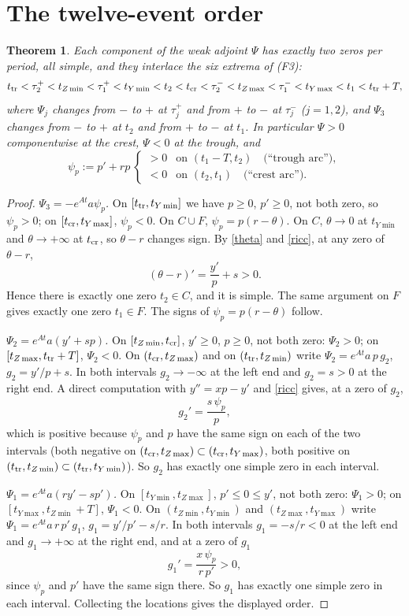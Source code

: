 \documentclass[11pt,a4paper]{article}
\newtheorem{theorem}{Theorem}
\theoremstyle{remark}\newtheorem{remark}[theorem]{Remark}
\begin{document}
\section{The twelve-event order}
\begin{theorem}\label{thm:twelve}
Each component of the weak adjoint $\Psi$ has exactly two zeros per period, all simple, and they
interlace the six extrema of (F3):
\[
t_{\rm tr}<\tau_2^+<t_{Z\min}<\tau_1^+<t_{Y\min}<t_2<t_{\rm cr}
<\tau_2^-<t_{Z\max}<\tau_1^-<t_{Y\max}<t_1<t_{\rm tr}+T,
\]
where $\Psi_j$ changes from $-$ to $+$ at $\tau_j^+$ and from $+$ to $-$ at $\tau_j^-$
($j=1,2$), and $\Psi_3$ changes from $-$ to $+$ at $t_2$ and from $+$ to $-$ at $t_1$.
In particular $\Psi>0$ componentwise at the crest, $\Psi<0$ at the trough, and
\[
\psi_p:=p'+rp\ \begin{cases}>0&\text{on }(t_1-T,t_2)\quad\text{(``trough arc'')},\\
<0&\text{on }(t_2,t_1)\quad\text{(``crest arc'')}.\end{cases}
\]
\end{theorem}
\begin{proof}
\emph{$\Psi_3=-e^{At}a\psi_p$.} On $[t_{\rm tr},t_{Y\min}]$ we have $p\ge0$, $p'\ge0$, not both
zero, so $\psi_p>0$; on $[t_{\rm cr},t_{Y\max}]$, $\psi_p<0$. On $C\cup F$,
$\psi_p=p(r-\theta)$. On $C$, $\theta\to0$ at $t_{Y\min}$ and $\theta\to+\infty$ at $t_{\rm cr}$,
so $\theta-r$ changes sign. By \eqref{theta} and \eqref{ricc}, at any zero of $\theta-r$,
\[
(\theta-r)'=\frac{y'}{p}+s>0 .
\]
Hence there is exactly one zero $t_2\in C$, and it is simple. The same argument on $F$ gives
exactly one zero $t_1\in F$. The signs of $\psi_p=p(r-\theta)$ follow.

\emph{$\Psi_2=e^{At}a(y'+sp)$.} On $[t_{Z\min},t_{\rm cr}]$, $y'\ge0$, $p\ge0$, not both zero:
$\Psi_2>0$; on $[t_{Z\max},t_{\rm tr}+T]$, $\Psi_2<0$. On $(t_{\rm cr},t_{Z\max})$ and on
$(t_{\rm tr},t_{Z\min})$ write $\Psi_2=e^{At}a\,p\,g_2$, $g_2=y'/p+s$. In both intervals
$g_2\to-\infty$ at the left end and $g_2=s>0$ at the right end. A direct computation with
$y''=xp-y'$ and \eqref{ricc} gives, at a zero of $g_2$,
\[
g_2'=\frac{s\,\psi_p}{p},
\]
which is positive because $\psi_p$ and $p$ have the same sign on each of the two intervals
(both negative on $(t_{\rm cr},t_{Z\max})\subset(t_{\rm cr},t_{Y\max})$, both positive on
$(t_{\rm tr},t_{Z\min})\subset(t_{\rm tr},t_{Y\min})$). So $g_2$ has exactly one simple zero in
each interval.

\emph{$\Psi_1=e^{At}a(ry'-sp')$.} On $[t_{Y\min},t_{Z\max}]$, $p'\le0\le y'$, not both zero:
$\Psi_1>0$; on $[t_{Y\max},t_{Z\min}+T]$, $\Psi_1<0$. On $(t_{Z\min},t_{Y\min})$ and
$(t_{Z\max},t_{Y\max})$ write $\Psi_1=e^{At}a\,r\,p'\,g_1$, $g_1=y'/p'-s/r$. In both intervals
$g_1=-s/r<0$ at the left end and $g_1\to+\infty$ at the right end, and at a zero of $g_1$
\[
g_1'=\frac{x\,\psi_p}{r\,p'}>0 ,
\]
since $\psi_p$ and $p'$ have the same sign there. So $g_1$ has exactly one simple zero in each
interval. Collecting the locations gives the displayed order.
\end{proof}
\end{document}
